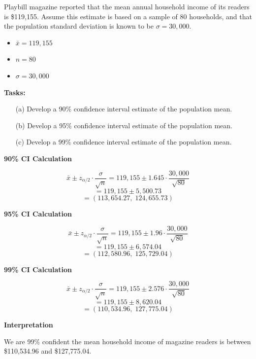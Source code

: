\begin{example}
Playbill magazine reported that the mean annual household income of its readers is \$119{,}155. Assume this estimate is based on a sample of 80 households, and that the population standard deviation is known to be $\sigma = 30{,}000$.

\begin{itemize}
  \item $\bar{x} = 119{,}155$
  \item $n = 80$
  \item $\sigma = 30{,}000$
\end{itemize}

\textbf{Tasks:}
\begin{enumerate}
  \item[(a)] Develop a 90\% confidence interval estimate of the population mean.
  \item[(b)] Develop a 95\% confidence interval estimate of the population mean.
  \item[(c)] Develop a 99\% confidence interval estimate of the population mean.
\end{enumerate}



\textbf{90\% CI Calculation}

\[
\bar{x} \pm z_{\alpha/2} \cdot \frac{\sigma}{\sqrt{n}} = 119{,}155 \pm 1.645 \cdot \frac{30{,}000}{\sqrt{80}}
\]
\[
= 119{,}155 \pm 5{,}500.73
\]
\[
= (113{,}654.27, \; 124{,}655.73)
\]

\textbf{95\% CI Calculation}

\[
\bar{x} \pm z_{\alpha/2} \cdot \frac{\sigma}{\sqrt{n}} = 119{,}155 \pm 1.96 \cdot \frac{30{,}000}{\sqrt{80}}
\]
\[
= 119{,}155 \pm 6{,}574.04
\]
\[
= (112{,}580.96, \; 125{,}729.04)
\]


\textbf{99\% CI Calculation}

\[
\bar{x} \pm z_{\alpha/2} \cdot \frac{\sigma}{\sqrt{n}} = 119{,}155 \pm 2.576 \cdot \frac{30{,}000}{\sqrt{80}}
\]
\[
= 119{,}155 \pm 8{,}620.04
\]
\[
= (110{,}534.96, \; 127{,}775.04)
\]


\textbf{Interpretation}


We are 99\% confident the mean household income of magazine readers is between \$110{,}534.96 and \$127{,}775.04.
\end{example}
